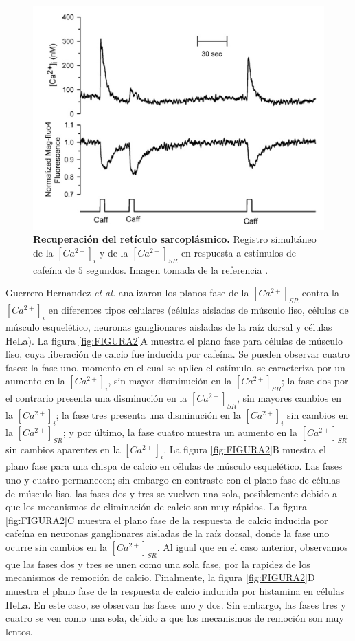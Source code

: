 \documentclass[draft]{article}
\newcommand{\Cai}{[Ca^{2+}]_{i}}
\newcommand{\Cal}{[Ca^{2+}]_{SR}}
\newcommand{\al}{\textit{et al.} }
\begin{document}
\begin{figure}[h]
	\centering
	\includegraphics{FIGURA1}
	\caption{\textbf{Recuperación del retículo sarcoplásmico.} Registro simultáneo de la $\Cai$ y de la $\Cal$ en respuesta a estímulos de cafeína de $5$ segundos. Imagen tomada de la referencia \cite{Dagnino-Acosta2009}.}
	\label{fig:FIGURA1}
\end{figure}

Guerrero-Hernandez \al \cite{Guerrero-Hernandez2010} analizaron los planos fase de la $\Cal$ contra la $\Cai$ en diferentes tipos celulares (células aisladas de músculo liso, células de músculo esquelético, neuronas ganglionares aisladas de la raíz dorsal y células HeLa). La figura \ref{fig:FIGURA2}A muestra el plano fase para células de músculo liso, cuya liberación de calcio fue inducida por cafeína. Se pueden observar cuatro fases: la fase uno, momento en el cual se aplica el estímulo, se caracteriza por un aumento en la $\Cai$, sin mayor disminución en la $\Cal$; la fase dos por el contrario presenta una disminución en la $\Cal$, sin mayores cambios en la $\Cai$; la fase tres presenta una disminución en la $\Cai$ sin cambios en la $\Cal$; y por último, la fase cuatro muestra un aumento en la $\Cal$ sin cambios aparentes en la $\Cai$. La figura \ref{fig:FIGURA2}B muestra el plano fase para una chispa de calcio en células de músculo esquelético. Las fases uno y cuatro permanecen; sin embargo en contraste con el plano fase de células de músculo liso, las fases dos y tres se vuelven una sola, posiblemente debido a que los mecanismos de eliminación de calcio son muy rápidos. La figura \ref{fig:FIGURA2}C muestra el plano fase de la respuesta de calcio inducida por cafeína en neuronas ganglionares aisladas de la raíz dorsal, donde la fase uno ocurre sin cambios en la $\Cal$. Al igual que en el caso anterior, observamos que las fases dos y tres se unen como una sola fase, por la rapidez de los mecanismos de remoción de calcio. Finalmente, la figura \ref{fig:FIGURA2}D muestra el plano fase de la respuesta de calcio inducida por histamina en células HeLa. En este caso, se observan las fases uno y dos. Sin embargo, las fases tres y cuatro se ven como una sola, debido a que los mecanismos de remoción son muy lentos. \\
\end{document}
